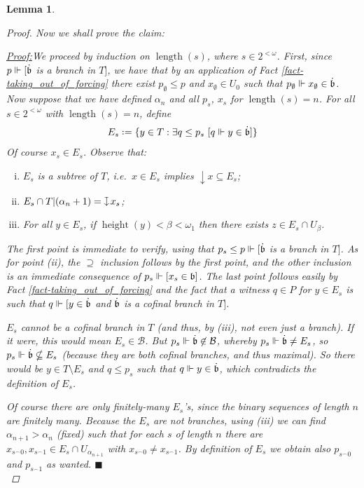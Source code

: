 \documentclass[11pt,a4paper]{report}
\newtheorem{lemma}[theorem]{Lemma}
\theoremstyle{definition}
\theoremstyle{num.custom-title}
\theoremstyle{custom-title}
\newenvironment{claimproof}[1]{\par\noindent\underline{Proof:}\space#1}{\leavevmode\unskip\penalty9999 \hbox{}\nobreak\hfill\quad\hbox{$\blacksquare$}} %
\DeclareMathOperator{\sm}{\setminus}
\DeclareMathOperator{\sse}{\subseteq}
\DeclareMathOperator{\height}{height}
\DeclareMathOperator{\length}{length}
\DeclareMathOperator{\down}{\downarrow}
\newcommand{\B}{\mathcal{B}}
\newcommand{\conc}{^\frown}
\newcommand{\downmapsto}{%
           \mathrel{\raisebox{.1em}{%
							\rotatebox[origin=c]{-90}{$\mapsto$}}}}
\newcommand*{\defeq}{\mathrel{\rlap{%
                     \raisebox{0.3ex}{$\cdot$}}%
                     \raisebox{-0.3ex}{$\cdot$}}%
                     =}
\newcommand{\forces}{\Vdash}
\begin{document}
\begin{lemma}
\begin{proof}
Now we shall prove the claim:
\begin{claimproof}
We proceed by induction on $\length(s)$, where $s \in 2^{<\omega}$. First, since $p \forces [\dot{\b}$ is a branch in $T]$, we have that by an application of Fact \ref{fact-taking_out_of_forcing} there exist $p_\emptyset \leq p$ and $x_\emptyset \in U_0$ such that $p_\emptyset \forces x_\emptyset \in \dot{\b}$.\\
Now suppose that we have defined $\alpha_n$ and all $p_s$, $x_s$ for $\length(s)=n$. For all $s \in 2^{<\omega}$ with $\length(s)=n$, define
\[
E_s \defeq \{ y \in T : \exists q \leq p_s \ [q \forces y \in \dot{\b}] \}
\]
Of course $x_s \in E_s$. Observe that:
\begin{enumerate}[(i)]
\item $E_s$ is a \emph{subtree} of $T$, i.e.\ $x \in E_s$ implies $\down x \sse E_s$;
\item $E_s \cap T|(\alpha_n + 1) = {\downmapsto x_s}$;
\item For all $y \in E_s$, if $\height(y) < \beta < \omega_1$ then there exists $z \in E_s \cap U_\beta$.
\end{enumerate}
The first point is immediate to verify, using that $p_s \leq p \forces [\dot{\b}$ is a branch in $T]$. As for point (ii), the $\supseteq$ inclusion follows by the first point, and the other inclusion is an immediate consequence of $p_s \forces [x_s \in \b]$. The last point follows easily by Fact \ref{fact-taking_out_of_forcing} and the fact that a witness $q \in P$ for $y \in E_s$ is such that $q \forces [y \in \dot{\b}$ and $\dot{\mathfrak{b}}$ is a cofinal branch in $T]$.

$E_s$ cannot be a cofinal branch in $T$ (and thus, by (iii), not even just a branch). If it were, this would mean $E_s \in \B$. But $p_s \forces \dot{\b} \not\in \B$, whereby $p_s \forces \dot{\b} \neq E_s$, so $p_s \forces \dot{\b} \nsubseteq E_s$ (because they are both cofinal branches, and thus maximal). So there would be $y \in T \sm E_s$ and $q \leq p_s$ such that $q \forces y \in \dot{\b}$, which contradicts the definition of $E_s$.

Of course there are only finitely-many $E_s$'s, since the binary sequences of length $n$ are finitely many. Because the $E_s$ are not branches, using (iii) we can find $\alpha_{n+1} > \alpha_n$ (fixed) such that for each $s$ of length $n$ there are $x_{s \conc 0}, x_{s \conc 1} \in E_s \cap U_{\alpha_{n+1}}$ with $x_{s \conc 0} \neq x_{s \conc 1}$. By definition of $E_s$ we obtain also $p_{s \conc 0}$ and $p_{s \conc 1}$ as wanted.
\end{claimproof}\\
\end{proof}
\end{lemma}
\end{document}
